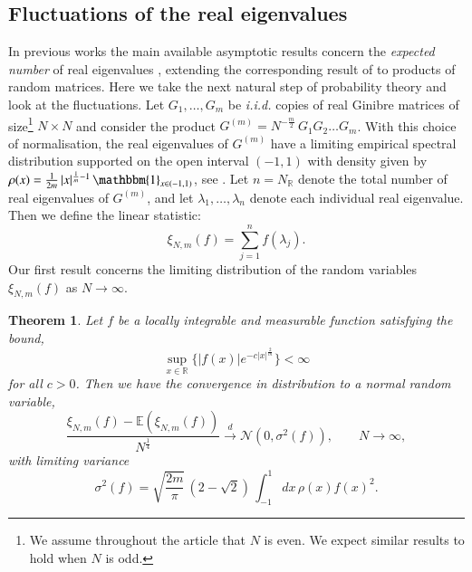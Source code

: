 \documentclass[11pt,reqno]{amsproc}
\newtheorem{theorem}{Theorem}
\numberwithin{equation}{section}
\numberwithin{theorem}{section}
\begin{document}
\subsection{Fluctuations of the real eigenvalues}
\label{se:bulkfluct}
In previous works the main available asymptotic results concern the \textit{expected number} of real eigenvalues \cite{FI16,S17}, extending the corresponding result of \cite{EKS94} to products of random matrices. Here we take the next natural step of probability theory and look at the fluctuations. Let $G_{1}, \ldots, G_{m}$ be \textit{i.i.d.} copies of real Ginibre matrices of size\footnote{We assume throughout the article that $N$ is even. We expect similar results to hold when $N$ is odd.} $N \times N$ and consider the product $G^{(m)} = N^{-\frac{m}{2}}\,G_{1}G_{2}\ldots G_{m}$. With this choice of normalisation, the real eigenvalues of $G^{(m)}$ have a limiting empirical spectral distribution supported on the open interval $(-1,1)$ with density given by $\rho(x) = \frac{1}{2m}\,|x|^{\frac{1}{m}-1}\,\mathbbm{1}_{x \in (-1,1)}$, see \cite{FI16,S17}. Let $n=N_{\mathbb{R}}$ denote the total number of real eigenvalues of $G^{(m)}$, and let $\lambda_1,\ldots,\lambda_n$ denote each individual real eigenvalue. Then we define the linear statistic:
\begin{equation}
\xi_{N,m}(f) = \sum_{j=1}^{n}f(\lambda_j). \label{linstat}
\end{equation}
Our first result concerns the limiting distribution of the random variables $\xi_{N,m}(f)$ as $N \to \infty$.
\begin{theorem}
\label{th:ginconv}
Let $f$ be a locally integrable and measurable function satisfying the bound,
\begin{equation}
\sup_{x \in \mathbb{R}}\bigg\{|f(x)|e^{-c|x|^{\frac{2}{m}}}\bigg\} < \infty \label{growthcond}
\end{equation}
for all $c>0$. Then we have the convergence in distribution to a normal random variable,
\begin{equation}
\frac{\xi_{N,m}(f)-\mathbb{E}(\xi_{N,m}(f))}{N^{\frac{1}{4}}} \overset{d}{\longrightarrow} \mathcal{N}(0,\sigma^{2}(f)), \qquad N \to \infty, \label{normalconv}
\end{equation}
with limiting variance
\begin{equation}
\sigma^{2}(f) = \sqrt{\frac{2m}{\pi}}\,(2-\sqrt{2})\,\int_{-1}^{1}dx\,\rho(x)f(x)^{2}. \label{varlim}
\end{equation}
\end{theorem}
\end{document}
